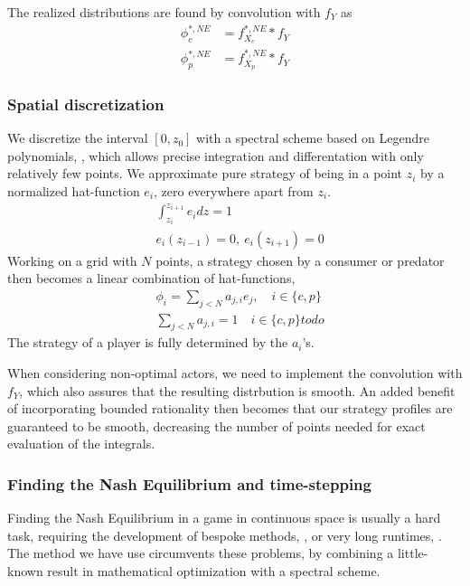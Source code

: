 The realized distributions are found by convolution with $f_Y$ as
\begin{align*}
  \phi_c^{*,NE} &= f_{X_c}^{*,NE} * f_Y \\
  \phi_p^{*,NE} &= f_{X_p}^{*,NE} * f_Y
\end{align*}

\subsubsection*{Spatial discretization}
We discretize the interval $[0,z_0]$ with a spectral scheme based on Legendre polynomials, \citep{kopriva2009implementing}, which allows precise integration and differentation with only relatively few points.
We approximate pure strategy of being in a point $z_i$  by a normalized hat-function $e_i$, zero everywhere apart from $z_i$.
\begin{align*}
	& \int_{z_i}^{z_{i+1}} e_i dz = 1 \\
	&e_i(z_{i-1}) = 0,~ e_i(z_{i+1}) = 0
\end{align*}
Working on a grid with $N$ points, a strategy chosen by a consumer or predator then becomes a linear combination of hat-functions,
\begin{align*}
  &\phi_{i} = \sum_{j<N} a_{j,i} e_j, \quad i\in \{c,p\} \\
  &\sum_{j<N} a_{j,i} = 1 \quad i\in \{c,p\}todo
\end{align*}
The strategy of a player is fully determined by the $a_i$'s.

When considering non-optimal actors, we need to implement the convolution with $f_Y$, which also assures that the resulting distrbution is smooth. An added benefit of incorporating bounded rationality then becomes that our strategy profiles are guaranteed to be smooth, decreasing the number of points needed for exact evaluation of the integrals.


\subsubsection*{Finding the Nash Equilibrium and time-stepping}
Finding the Nash Equilibrium in a game in continuous space is usually a hard task, requiring the development of bespoke methods, \citep{verticalmigration}, or very long runtimes, \citep{jerome}. The method we have use circumvents these problems, by combining a little-known result in mathematical optimization with a spectral scheme.

